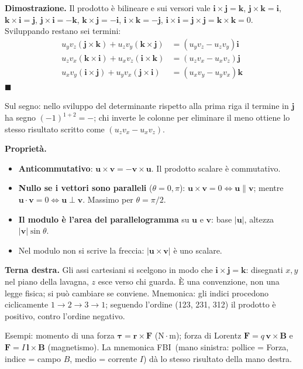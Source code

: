 \documentclass[11pt,a4paper]{article}
\newcommand{\vv}[1]{\mathbf{#1}}
\newcommand{\mo}[1]{\left|#1\right|}
\begin{document}
\textbf{Dimostrazione.} Il prodotto è bilineare e sui versori vale $\vv i\times\vv j=\vv k$, $\vv j\times\vv k=\vv i$, $\vv k\times\vv i=\vv j$, $\vv j\times\vv i=-\vv k$, $\vv k\times\vv j=-\vv i$, $\vv i\times\vv k=-\vv j$, $\vv i\times\vv i=\vv j\times\vv j=\vv k\times\vv k=0$. Sviluppando restano sei termini:
\begin{align*}
u_yv_z(\vv j\times\vv k)+u_zv_y(\vv k\times\vv j)&=(u_yv_z-u_zv_y)\vv i\\
u_zv_x(\vv k\times\vv i)+u_xv_z(\vv i\times\vv k)&=(u_zv_x-u_xv_z)\vv j\\
u_xv_y(\vv i\times\vv j)+u_yv_x(\vv j\times\vv i)&=(u_xv_y-u_yv_x)\vv k
\end{align*}
\hfill$\blacksquare$

Sul segno: nello sviluppo del determinante rispetto alla prima riga il termine in $\vv j$ ha segno $(-1)^{1+2}=-$; chi inverte le colonne per eliminare il meno ottiene lo stesso risultato scritto come $(u_zv_x-u_xv_z)$.

\textbf{Proprietà.}
\begin{itemize}[nosep]
\item \textbf{Anticommutativo}: $\vv u\times\vv v=-\vv v\times\vv u$. Il prodotto scalare è commutativo.
\item \textbf{Nullo se i vettori sono paralleli} ($\theta=0,\pi$): $\vv u\times\vv v=0\iff\vv u\parallel\vv v$; mentre $\vv u\cdot\vv v=0\iff\vv u\perp\vv v$. Massimo per $\theta=\pi/2$.
\item \textbf{Il modulo è l'area del parallelogramma} su $\vv u$ e $\vv v$: base $\mo{\vv u}$, altezza $\mo{\vv v}\sin\theta$.
\item Nel modulo non si scrive la freccia: $\mo{\vv u\times\vv v}$ è uno scalare.
\end{itemize}

\textbf{Terna destra.} Gli assi cartesiani si scelgono in modo che $\vv i\times\vv j=\vv k$: disegnati $x,y$ nel piano della lavagna, $z$ esce verso chi guarda. È una convenzione, non una legge fisica; si può cambiare se conviene. Mnemonica: gli indici procedono ciclicamente $1\to2\to3\to1$; seguendo l'ordine (123, 231, 312) il prodotto è positivo, contro l'ordine negativo.

Esempi: momento di una forza $\boldsymbol\tau=\vv r\times\vv F$ ($\mathrm{N\cdot m}$); forza di Lorentz $\vv F=q\,\vv v\times\vv B$ e $\vv F=I\,\vv l\times\vv B$ (magnetismo). La mnemonica \guillemotleft FBI\guillemotright\ (mano sinistra: pollice = Forza, indice = campo $B$, medio = corrente $I$) dà lo stesso risultato della mano destra.
\end{document}
